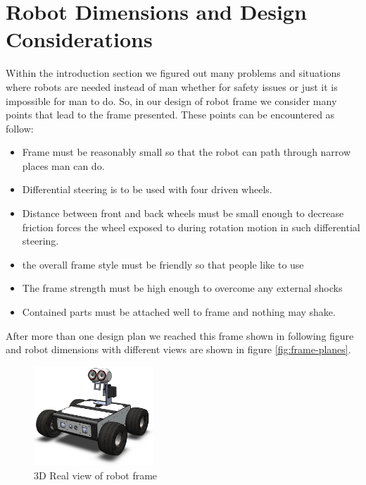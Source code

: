 \documentclass[12pt]{book}
\begin{document}
\section{Robot Dimensions and Design Considerations}
Within the introduction section we figured out many problems and situations where robots are needed instead of man whether for safety issues or just it is impossible for man to do. So, in our design of robot frame we consider many points that lead to the frame presented. These points can be encountered as follow:
\begin{itemize}
	\item Frame must be reasonably small so that the robot can path through narrow places man can do.
	\item Differential steering is to be used with four driven wheels.
	\item Distance between front and back wheels must be small enough to decrease friction forces the wheel exposed to during rotation motion in such differential steering. 
	\item the overall frame style must be friendly so that people like to use
	\item The frame strength must be high enough to overcome any external shocks
	\item Contained parts must be attached well to frame and nothing may shake.
\end{itemize}

After more than one design plan we reached this frame shown in following figure and robot dimensions with different views are shown in figure \ref{fig:frame-planes}.
\begin{figure}
	\centering
	\includegraphics[width =0.4\textwidth]{Fig/Introduction.png}
	\caption{3D Real view of robot frame}
\end{figure}
\end{document}
